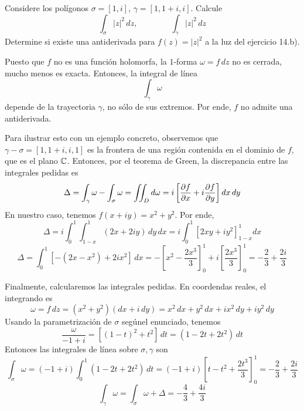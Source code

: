 \begin{exercise}
Considere los polígonos $\sigma = [1, i]$, $\gamma = [1, 1 + i, i]$. Calcule
$$\int_\sigma |z|^2 \, dz, \qquad \qquad \int_\gamma |z|^2 \, dz$$
Determine si existe una antiderivada para $f(z) = |z|^2$ a la luz del ejercicio 14.b).
\end{exercise}

\begin{solution}
Puesto que $f$ no es una función holomorfa, la $1$-forma $\omega = f \, dz$ no es cerrada, mucho menos es exacta. Entonces, la integral de línea
$$\int_\gamma \omega$$
depende de la trayectoria $\gamma$, no sólo de sus extremos. Por ende, $f$ no admite una antiderivada.

Para ilustrar esto con un ejemplo concreto, observemos que $\gamma - \sigma = [1, 1+i, i, 1]$ es la frontera de una región contenida en el dominio de $f$, que es el plano $\mathbb C$. Entonces, por el teorema de Green, la discrepancia entre las integrales pedidas es
$$\Delta = \int_\gamma \omega - \int_\sigma \omega = \iint_D d\omega = i \left[ \dfrac {\partial f} {\partial x} + i \dfrac {\partial f} {\partial y} \right] dx \, dy$$
En nuestro caso, tenemos $f(x + iy) = x^2 + y^2$. Por ende,
$$
\Delta
    = i \int_0^1 \int_{1-x}^1 (2x + 2iy) \, dy \, dx
    = i \int_0^1 \left[ 2xy + iy^2 \right]_{1-x}^1 dx
$$
$$
\Delta
    = \int_0^1 [-(2x - x^2) + 2ix^2] \, dx
    = -\left[ x^2 - \frac {2x^3} 3 \right]_0^1 + i \left[ \frac {2x^3} 3 \right]_0^1
    = -\frac 23 + \frac {2i} 3
$$

Finalmente, calcularemos las integrales pedidas. En coordendas reales, el integrando es
$$\omega = f \, dz = (x^2 + y^2) (dx + i \, dy) = x^2 \, dx + y^2 \, dx + ix^2 \, dy + iy^2 \, dy$$
Usando la parametrización de $\sigma$ segúnel enunciado, tenemos
$$\frac \omega {-1+i} = [(1-t)^2 + t^2] \, dt = (1 - 2t + 2t^2) \, dt$$
Entonces las integrales de línea sobre $\sigma, \gamma$ son
$$
\int_\sigma \omega
    = (-1+i) \int_0^1 (1 - 2t + 2t^2) \, dt
    = (-1+i) \left[ t - t^2 + \frac {2t^3} 3 \right]_0^1
    = -\frac 23 + \frac {2i} 3$$
$$\int_\gamma \omega = \int_\sigma \omega + \Delta = -\frac 43 + \frac {4i} 3$$
\end{solution}
